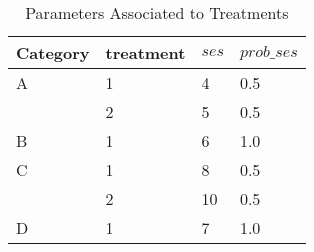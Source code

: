 \begin{table}[h]
\begin{tabular}{llll}
\hline
\multicolumn{1}{|l|}{Category} & \multicolumn{1}{l|}{treatment} & \multicolumn{1}{l|}{$ses$} & \multicolumn{1}{l|}{$prob\_ses$} \\ \hline
A                              & 1                              & 4                          & 0.5                              \\
                               & 2                              & 5                          & 0.5                              \\
B                              & 1                              & 6                          & 1.0                              \\
C                              & 1                              & 8                          & 0.5                              \\
                               & 2                              & 10                         & 0.5                              \\
D                              & 1                              & 7                          & 1.0                             
\end{tabular}
\caption{Parameters Associated to Treatments}
\end{table}

